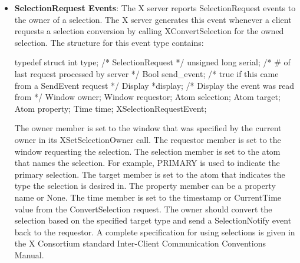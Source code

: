 \documentclass{report}
\begin{document}
\begin{itemize}
\begin{cppcode}
{                    Display *display;           /* Display the event was read from */
                    Window window;
                    Atom selection;
                    Time time;
                } XSelectionClearEvent; 
            \end{cppcode}
            \bigbreak \noindent 
            The selection member is set to the selection atom. The time member is set to the last change time recorded for the selection. The window member is the window that was specified by the current owner (the owner losing the selection) in its XSetSelectionOwner call.
        \item \textbf{SelectionRequest Events}: The X server reports SelectionRequest events to the owner of a selection. The X server generates this event whenever a client requests a selection conversion by calling XConvertSelection for the owned selection.
            \bigbreak \noindent 
            The structure for this event type contains:
            \bigbreak \noindent 
            \begin{cppcode}
                typedef struct {
                    int type;                   /* SelectionRequest */
                    unsigned long serial;       /* # of last request processed by server */
                    Bool send_event;            /* true if this came from a SendEvent request */
                    Display *display;           /* Display the event was read from */
                    Window owner;
                    Window requestor;
                    Atom selection;
                    Atom target;
                    Atom property;
                    Time time;
                } XSelectionRequestEvent;
            \end{cppcode}
            \bigbreak \noindent 
            The owner member is set to the window that was specified by the current owner in its XSetSelectionOwner call. The requestor member is set to the window requesting the selection. The selection member is set to the atom that names the selection. For example, PRIMARY is used to indicate the primary selection. The target member is set to the atom that indicates the type the selection is desired in. The property member can be a property name or None. The time member is set to the timestamp or CurrentTime value from the ConvertSelection request.
            \bigbreak \noindent 
            The owner should convert the selection based on the specified target type and send a SelectionNotify event back to the requestor. A complete specification for using selections is given in the X Consortium standard Inter-Client Communication Conventions Manual.

\end{itemize}
\end{document}
